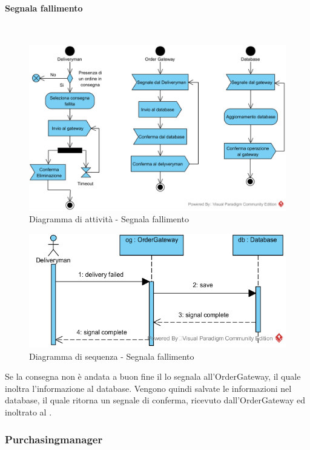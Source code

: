 \paragraph{Segnala fallimento}\mbox{}\\
\nopagebreak
\begin{figure}[H]
	\centering
	\includegraphics[width=14cm]{diagrammi_img/attivita/delivetyman_fallimento.png}
	\caption{Diagramma di attività - Segnala fallimento}
\end{figure}

\begin{figure}[H]
	\centering
	\includegraphics[width=14cm]{../../documenti/SpecificaTecnica/diagrammi_img/sequenza/fattorino_fallimento_consegna.png}
	\caption{Diagramma di sequenza - Segnala fallimento}
\end{figure}
Se la consegna non è andata a buon fine il \Deliveryman{} lo segnala all'Order\-Gateway, il quale inoltra l'informazione al database. Vengono quindi salvate le informazioni nel database, il quale ritorna un segnale di conferma, ricevuto dall'Order\-Gateway ed inoltrato al \Deliveryman{}.

\subsubsection{Purchasingmanager}



